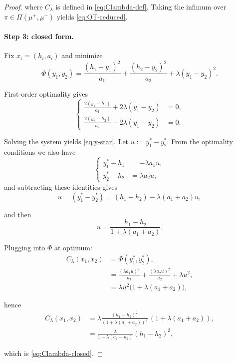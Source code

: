\documentclass[11pt]{article}
\begin{document}
\begin{proof}
where $C_\lambda$ is defined in \eqref{eq:Clambda-def}.
Taking the infimum over $\pi\in\Pi(\mu^+,\mu^-)$ yields \eqref{eq:OT-reduced}.

\paragraph{Step 3: closed form.}
Fix $x_i=(h_i,a_i)$ and minimize
\begin{equation*}
  \Phi(y_1,y_2)=\frac{(h_1-y_1)^2}{a_1}+\frac{(h_2-y_2)^2}{a_2}+\lambda (y_1-y_2)^2.
\end{equation*}

First-order optimality gives
\[ 
\begin{cases}
  \frac{2(y_1-h_1)}{a_1}+2\lambda(y_1-y_2)&=0,\\
\frac{2(y_2-h_2)}{a_2}-2\lambda(y_1-y_2)&=0.
\end{cases}
\]

Solving the system yields \eqref{eq:y-star}.
Let $u:=y_1^*-y_2^*$. From the optimality conditions we also have
\[
\begin{cases}
  y_1^*-h_1&=-\lambda a_1 u,\\
  y_2^*-h_2&=\lambda a_2 u,
\end{cases}
\]
and subtracting these identities gives
\begin{equation*}
  u=(y_1^*-y_2^*)=(h_1-h_2)-\lambda(a_1+a_2)u,
\end{equation*}

and then
\begin{equation*}
  u=\frac{h_1-h_2}{1+\lambda(a_1+a_2)}.
\end{equation*}


Plugging into $\Phi$ at optimum:
\begin{align*}
  C_\lambda(x_1,x_2)
&=\Phi(y_1^*,y_2^*), \\
&=
\frac{(\lambda a_1 u)^2}{a_1}+\frac{(\lambda a_2 u)^2}{a_2}+\lambda u^2, \\
&=
\lambda u^2\big(1+\lambda(a_1+a_2)\big),
\end{align*}

hence
\begin{align*}
  C_\lambda(x_1,x_2)
&=
\lambda \frac{(h_1-h_2)^2}{(1+\lambda(a_1+a_2))^2}\,(1+\lambda(a_1+a_2)), \\
&=
\frac{\lambda}{1+\lambda(a_1+a_2)}(h_1-h_2)^2,
\end{align*}

which is \eqref{eq:Clambda-closed}.
\end{proof}
\end{document}
